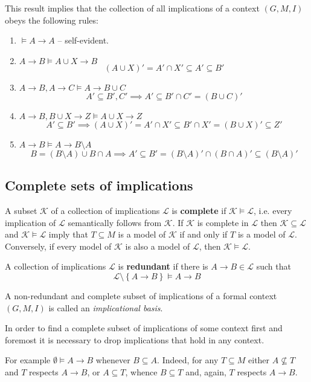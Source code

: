 \documentclass[a4paper]{article}
\newcommand{\obj}[1]{{\left\{ #1 \right \}}}
\newcommand{\brac}[1]{{\left ( #1 \right )}}
\newcommand{\Lcal}{\mathcal{L}}
\newcommand{\Kcal}{\mathcal{K}}
\begin{document}
This result implies that the collection of all implications of a context $(G,M,I)$ obeys the following rules:
\begin{enumerate}
	\item $\models A\to A$ -- self-evident.
	\item $A\to B\models A\cup X\to B$\hfill\[\brac{A\cup X}' = A'\cap X'\subseteq A'\subseteq B'\]
	\item $A\to B, A\to C\models A\to B\cup C$\hfill\[A'\subseteq B', C' \implies A'\subseteq B'\cap C' = \brac{B\cup C}'\]
	\item $A\to B, B\cup X\to Z\models A\cup X\to Z$\hfill
	\[ A'\subseteq B'\implies \brac{A\cup X}' = A'\cap X'  \subseteq B'\cap X' = \brac{B\cup X}' \subseteq Z'\]
	\item $A\to B\models A\to B\setminus A$\hfill \[B = (B\setminus A) \cup B\cap A \implies A'\subseteq B' = \brac{B\setminus A}' \cap \brac{B\cap A}'\subseteq \brac{B\setminus A}'\]
\end{enumerate}


\subsection{Complete sets of implications} %
\label{sub:complete_sets_of_implications}

A subset $\Kcal$ of a collection of implications $\Lcal$ is \textbf{complete} if $\Kcal\models \Lcal$, i.e. every implication of $\Lcal$ semantically follows from $\Kcal$. If $\Kcal$ is complete in $\Lcal$ then $\Kcal\subseteq \Lcal$ and $\Kcal\models \Lcal$ imply that $T\subseteq M$ is a model of $\Kcal$ if and only if $T$ is a model of $\Lcal$. Conversely, if every model of $\Kcal$ is also a model of $\Lcal$, then $\Kcal\models \Lcal$.

A collection of implications $\Lcal$ is \textbf{redundant} if there is $A\to B\in \Lcal$ such that \[\Lcal\setminus\obj{A\to B}\models A\to B\]

A non-redundant and complete subset of implications of a formal context $(G,M,I)$ is called an \emph{implicational basis}.

In order to find a complete subset of implications of some context first and foremost it is necessary to drop implications that hold in any context.

For example $\emptyset\models A\to B$ whenever $B\subseteq A$. Indeed, for any $T\subseteq M$ either $A\not\subseteq T$ and $T$ respects $A\to B$, or $A\subseteq T$, whence $B\subseteq T$ and, again, $T$ respects $A\to B$.
\end{document}
